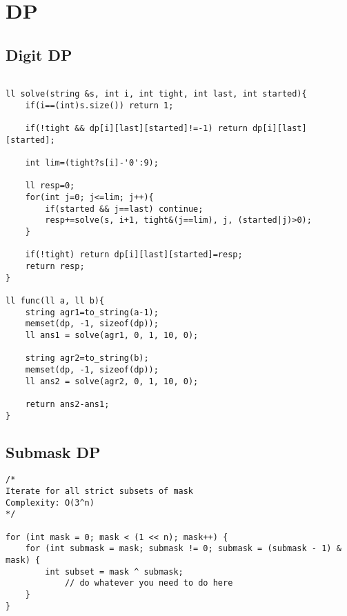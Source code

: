\documentclass[11pt, a4paper, twoside]{article}
\begin{document}
%
%

\section{DP}

\subsection{Digit DP}
\begin{verbatim}

ll solve(string &s, int i, int tight, int last, int started){ 
    if(i==(int)s.size()) return 1;
    
    if(!tight && dp[i][last][started]!=-1) return dp[i][last][started];
    
    int lim=(tight?s[i]-'0':9);
    
    ll resp=0;
    for(int j=0; j<=lim; j++){
        if(started && j==last) continue;
        resp+=solve(s, i+1, tight&(j==lim), j, (started|j)>0);
    }
    
    if(!tight) return dp[i][last][started]=resp;
    return resp;
}

ll func(ll a, ll b){
    string agr1=to_string(a-1);
    memset(dp, -1, sizeof(dp));
    ll ans1 = solve(agr1, 0, 1, 10, 0);
    
    string agr2=to_string(b);
    memset(dp, -1, sizeof(dp));
    ll ans2 = solve(agr2, 0, 1, 10, 0);
        
    return ans2-ans1;
}
\end{verbatim}

\subsection{Submask DP}
\begin{verbatim}
/*
Iterate for all strict subsets of mask
Complexity: O(3^n)
*/

for (int mask = 0; mask < (1 << n); mask++) {
    for (int submask = mask; submask != 0; submask = (submask - 1) & mask) {
        int subset = mask ^ submask;
            // do whatever you need to do here
    }
}

\end{verbatim}
\end{document}
